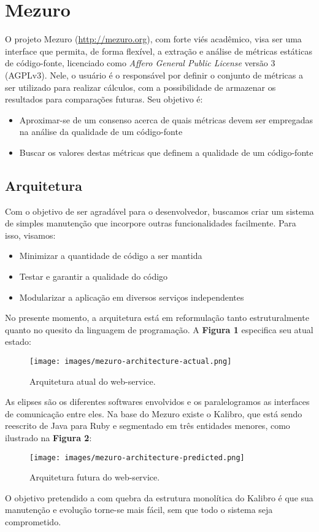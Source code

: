 \documentclass[12pt]{article}
\begin{document}
\section{Mezuro}
O projeto Mezuro (\url{http://mezuro.org}), com forte viés acadêmico, visa ser uma interface que permita, de forma flexível, a extração e análise de métricas estáticas de código-fonte, licenciado como \textit{Affero General Public License} versão 3 (AGPLv3). Nele, o usuário é o responsável por definir o conjunto de métricas a ser utilizado para realizar cálculos, com a possibilidade de armazenar os resultados para comparações futuras. Seu objetivo é:
\begin{itemize}
    \item Aproximar-se de um consenso acerca de quais métricas devem ser empregadas na análise da qualidade de um código-fonte
    \item Buscar os valores destas métricas que definem a qualidade de um código-fonte
\end{itemize}
  \subsection{Arquitetura}
  Com o objetivo de ser agradável para o desenvolvedor, buscamos criar um sistema de simples manutenção que incorpore outras funcionalidades facilmente. Para isso, visamos:
  \begin{itemize}
    \item Minimizar a quantidade de código a ser mantida
    \item Testar e garantir a qualidade do código
    \item Modularizar a aplicação em diversos serviços independentes
  \end{itemize}
  No presente momento, a arquitetura está em reformulação tanto estruturalmente quanto no quesito da linguagem de programação.
  A \textbf{Figura 1} especifica seu atual estado:
  \begin{figure}[H]
    \centering
      \texttt{[image: images/mezuro-architecture-actual.png]}
    \caption{Arquitetura atual do web-service.}
    \label{fig:architecture-1}
  \end{figure}
  As elipses são os diferentes softwares envolvidos e os paralelogramos as interfaces de comunicação entre eles. Na base do Mezuro existe o Kalibro, que está sendo reescrito
  de Java para Ruby e segmentado em três entidades menores, como ilustrado na \textbf{Figura 2}:
  \begin{figure}[H]
    \centering
      \texttt{[image: images/mezuro-architecture-predicted.png]}
    \caption{Arquitetura futura do web-service.}
    \label{fig:architecture-1}
  \end{figure}
  O objetivo pretendido a com quebra da estrutura monolítica do Kalibro é que sua manutenção e evolução torne-se mais fácil, sem que todo o sistema seja comprometido.
\end{document}
